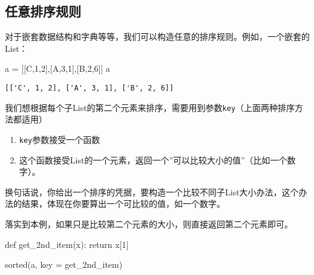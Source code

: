 \documentclass[
  letterpaper,
  DIV=11,
  numbers=noendperiod]{scrreprt}
\newenvironment{Shaded}{\begin{snugshade}}{\end{snugshade}}
\newcommand{\BuiltInTok}[1]{\textcolor[rgb]{0.00,0.23,0.31}{#1}}
\newcommand{\ControlFlowTok}[1]{\textcolor[rgb]{0.00,0.23,0.31}{#1}}
\newcommand{\DecValTok}[1]{\textcolor[rgb]{0.68,0.00,0.00}{#1}}
\newcommand{\KeywordTok}[1]{\textcolor[rgb]{0.00,0.23,0.31}{#1}}
\newcommand{\NormalTok}[1]{\textcolor[rgb]{0.00,0.23,0.31}{#1}}
\newcommand{\OperatorTok}[1]{\textcolor[rgb]{0.37,0.37,0.37}{#1}}
\newcommand{\StringTok}[1]{\textcolor[rgb]{0.13,0.47,0.30}{#1}}
\providecommand{\tightlist}{%
  \setlength{\itemsep}{0pt}\setlength{\parskip}{0pt}}\usepackage{longtable,booktabs,array}
\begin{document}
\hypertarget{ux4efbux610fux6392ux5e8fux89c4ux5219}{%
\subsection{任意排序规则}\label{ux4efbux610fux6392ux5e8fux89c4ux5219}}

对于嵌套数据结构和字典等等，我们可以构造任意的排序规则。例如，一个嵌套的List：

\begin{Shaded}
\begin{Highlighting}[]
\NormalTok{a }\OperatorTok{=}\NormalTok{ [[}\StringTok{\textquotesingle{}C\textquotesingle{}}\NormalTok{,}\DecValTok{1}\NormalTok{,}\DecValTok{2}\NormalTok{],[}\StringTok{\textquotesingle{}A\textquotesingle{}}\NormalTok{,}\DecValTok{3}\NormalTok{,}\DecValTok{1}\NormalTok{],[}\StringTok{\textquotesingle{}B\textquotesingle{}}\NormalTok{,}\DecValTok{2}\NormalTok{,}\DecValTok{6}\NormalTok{]]}
\NormalTok{a}
\end{Highlighting}
\end{Shaded}

\begin{verbatim}
[['C', 1, 2], ['A', 3, 1], ['B', 2, 6]]
\end{verbatim}

我们想根据每个子List的第二个元素来排序，需要用到参数\texttt{key}（上面两种排序方法都适用）

\begin{enumerate}
\def\labelenumi{\arabic{enumi}.}
\tightlist
\item
  \texttt{key}参数接受一个函数
\item
  这个函数接受List的一个元素，返回一个''可以比较大小的值''（比如一个数字）。
\end{enumerate}

换句话说，你给出一个排序的凭据，要构造一个比较不同子List大小办法，这个办法的结果，体现在你要算出一个可比较的值，如一个数字。

落实到本例，如果只是比较第二个元素的大小，则直接返回第二个元素即可。

\begin{Shaded}
\begin{Highlighting}[]
\KeywordTok{def}\NormalTok{ get\_2nd\_item(x):}
    \ControlFlowTok{return}\NormalTok{ x[}\DecValTok{1}\NormalTok{]}

\BuiltInTok{sorted}\NormalTok{(a, key }\OperatorTok{=}\NormalTok{ get\_2nd\_item)}
\end{Highlighting}
\end{Shaded}
\end{document}
